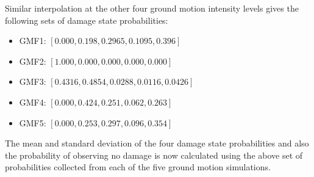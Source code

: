 Similar interpolation at the other four ground motion intensity levels gives the following sets of damage state probabilities:

\begin{itemize}
	\item GMF1: $[0.000, 0.198, 0.2965, 0.1095, 0.396]$
	\item GMF2: $[1.000, 0.000, 0.000, 0.000, 0.000]$
	\item GMF3: $[0.4316, 0.4854, 0.0288, 0.0116, 0.0426]$
	\item GMF4: $[0.000, 0.424, 0.251, 0.062, 0.263]$
	\item GMF5: $[0.000, 0.253, 0.297, 0.096, 0.354]$
\end{itemize}

The mean and standard deviation of the four damage state probabilities and also the probability of observing no damage is now calculated using the above set of probabilities collected from each of the five ground motion simulations.